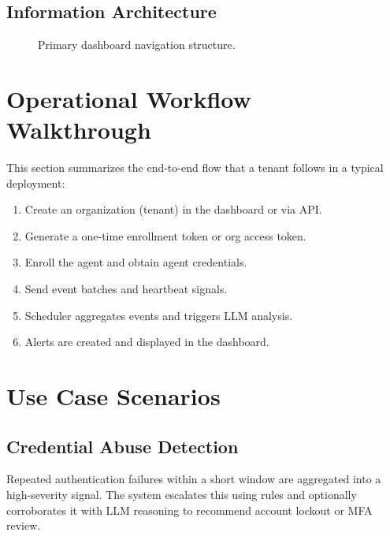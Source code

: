 \documentclass[conference]{IEEEtran}
\begin{document}
\subsection{Information Architecture}
\begin{figure}[!t]
\centering
{}
\caption{Primary dashboard navigation structure.}
\label{fig:ui-nav}
\end{figure}

\section{Operational Workflow Walkthrough}
This section summarizes the end-to-end flow that a tenant follows in a typical deployment:
\begin{enumerate}[leftmargin=1.2em]
    \item Create an organization (tenant) in the dashboard or via API.
    \item Generate a one-time enrollment token or org access token.
    \item Enroll the agent and obtain agent credentials.
    \item Send event batches and heartbeat signals.
    \item Scheduler aggregates events and triggers LLM analysis.
    \item Alerts are created and displayed in the dashboard.
\end{enumerate}

\section{Use Case Scenarios}
\subsection{Credential Abuse Detection}
Repeated authentication failures within a short window are aggregated into a high-severity signal. The system escalates this using rules and optionally corroborates it with LLM reasoning to recommend account lockout or MFA review.
\end{document}
